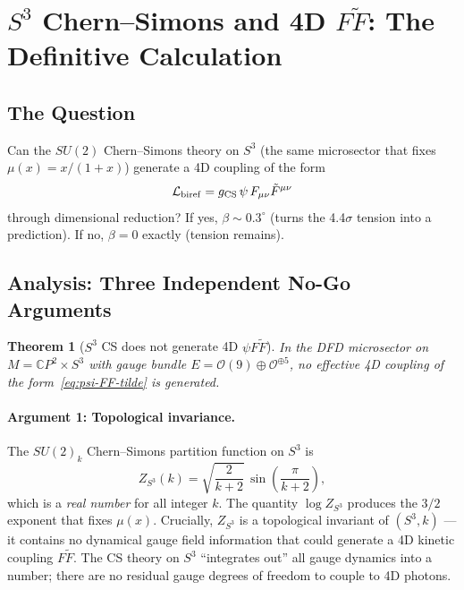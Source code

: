 \documentclass[11pt]{article}
\newcommand{\CS}{Chern--Simons}
\newtheorem{theorem}{Theorem}
\begin{document}
\section{$S^3$ Chern--Simons and 4D $F\tilde{F}$: The Definitive Calculation}
\label{sec:S3CS}

\subsection{The Question}

Can the $SU(2)$ \CS{} theory on $S^3$ (the same microsector that
fixes $\mu(x) = x/(1+x)$) generate a 4D coupling of the form
\begin{equation}
\mathcal{L}_{\rm biref} = g_{\rm CS}\,\psi\,F_{\mu\nu}\tilde{F}^{\mu\nu}
\label{eq:psi-FF-tilde}
\end{equation}
through dimensional reduction?  If yes, $\beta \sim 0.3^\circ$
(turns the 4.4$\sigma$ tension into a prediction).  If no,
$\beta = 0$ exactly (tension remains).

\subsection{Analysis: Three Independent No-Go Arguments}

\begin{theorem}[$S^3$ CS does not generate 4D $\psi F\tilde{F}$]
\label{thm:no-CS-biref}
In the DFD microsector on $M = \mathbb{C}P^2 \times S^3$ with
gauge bundle $E = \mathcal{O}(9) \oplus \mathcal{O}^{\oplus 5}$,
no effective 4D coupling of the form~\eqref{eq:psi-FF-tilde}
is generated.
\end{theorem}

\paragraph{Argument 1: Topological invariance.}
The $SU(2)_k$ \CS{} partition function on $S^3$ is
\begin{equation}
Z_{S^3}(k) = \sqrt{\frac{2}{k+2}}\,\sin\!\left(\frac{\pi}{k+2}\right),
\end{equation}
which is a \emph{real number} for all integer $k$.  The quantity
$\log Z_{S^3}$ produces the $3/2$ exponent that fixes $\mu(x)$.
Crucially, $Z_{S^3}$ is a topological invariant of $(S^3, k)$ ---
it contains no dynamical gauge field information that could generate
a 4D kinetic coupling $F\tilde{F}$.  The CS theory on $S^3$
``integrates out'' all gauge dynamics into a number; there are no
residual gauge degrees of freedom to couple to 4D photons.
\end{document}
